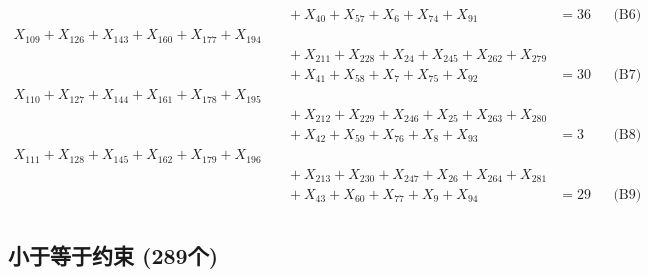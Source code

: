 \documentclass[a4paper,10pt]{article}
\begin{document}
{\begin{align}
&\quad  + X_{40} + X_{57} + X_{6} + X_{74} + X_{91} &= 36 && \text{(B6)} \\
X_{109} + X_{126} + X_{143} + X_{160} + X_{177} + X_{194} \\[0.5ex]
&\quad  + X_{211} + X_{228} + X_{24} + X_{245} + X_{262} + X_{279} \\[0.5ex]
&\quad  + X_{41} + X_{58} + X_{7} + X_{75} + X_{92} &= 30 && \text{(B7)} \\
X_{110} + X_{127} + X_{144} + X_{161} + X_{178} + X_{195} \\[0.5ex]
&\quad  + X_{212} + X_{229} + X_{246} + X_{25} + X_{263} + X_{280} \\[0.5ex]
&\quad  + X_{42} + X_{59} + X_{76} + X_{8} + X_{93} &= 3 && \text{(B8)} \\
X_{111} + X_{128} + X_{145} + X_{162} + X_{179} + X_{196} \\[0.5ex]
&\quad  + X_{213} + X_{230} + X_{247} + X_{26} + X_{264} + X_{281} \\[0.5ex]
&\quad  + X_{43} + X_{60} + X_{77} + X_{9} + X_{94} &= 29 && \text{(B9)} \\
\end{align}}

\subsection{小于等于约束 (289个)}
\end{document}
